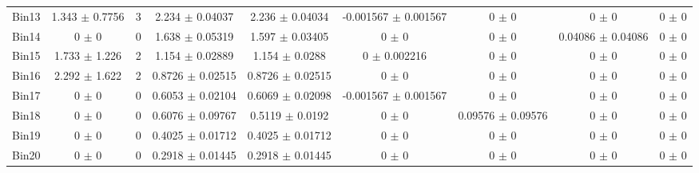 \begin{tabular}{@{\extracolsep{4pt}}lcccccccc@{}}
     Bin13 & 1.343 $\pm$ 0.7756 & 3 & 2.234 $\pm$ 0.04037 & 2.236 $\pm$ 0.04034 & -0.001567 $\pm$ 0.001567 & 0 $\pm$ 0 & 0 $\pm$ 0 & 0 $\pm$ 0 \\ 
     Bin14 & 0 $\pm$ 0 & 0 & 1.638 $\pm$ 0.05319 & 1.597 $\pm$ 0.03405 & 0 $\pm$ 0 & 0 $\pm$ 0 & 0.04086 $\pm$ 0.04086 & 0 $\pm$ 0 \\ 
     Bin15 & 1.733 $\pm$ 1.226 & 2 & 1.154 $\pm$ 0.02889 & 1.154 $\pm$ 0.0288 & 0 $\pm$ 0.002216 & 0 $\pm$ 0 & 0 $\pm$ 0 & 0 $\pm$ 0 \\ 
     Bin16 & 2.292 $\pm$ 1.622 & 2 & 0.8726 $\pm$ 0.02515 & 0.8726 $\pm$ 0.02515 & 0 $\pm$ 0 & 0 $\pm$ 0 & 0 $\pm$ 0 & 0 $\pm$ 0 \\ 
     Bin17 & 0 $\pm$ 0 & 0 & 0.6053 $\pm$ 0.02104 & 0.6069 $\pm$ 0.02098 & -0.001567 $\pm$ 0.001567 & 0 $\pm$ 0 & 0 $\pm$ 0 & 0 $\pm$ 0 \\ 
     Bin18 & 0 $\pm$ 0 & 0 & 0.6076 $\pm$ 0.09767 & 0.5119 $\pm$ 0.0192 & 0 $\pm$ 0 & 0.09576 $\pm$ 0.09576 & 0 $\pm$ 0 & 0 $\pm$ 0 \\ 
     Bin19 & 0 $\pm$ 0 & 0 & 0.4025 $\pm$ 0.01712 & 0.4025 $\pm$ 0.01712 & 0 $\pm$ 0 & 0 $\pm$ 0 & 0 $\pm$ 0 & 0 $\pm$ 0 \\ 
     Bin20 & 0 $\pm$ 0 & 0 & 0.2918 $\pm$ 0.01445 & 0.2918 $\pm$ 0.01445 & 0 $\pm$ 0 & 0 $\pm$ 0 & 0 $\pm$ 0 & 0 $\pm$ 0 \\ 
\hline\hline
  \end{tabular}
